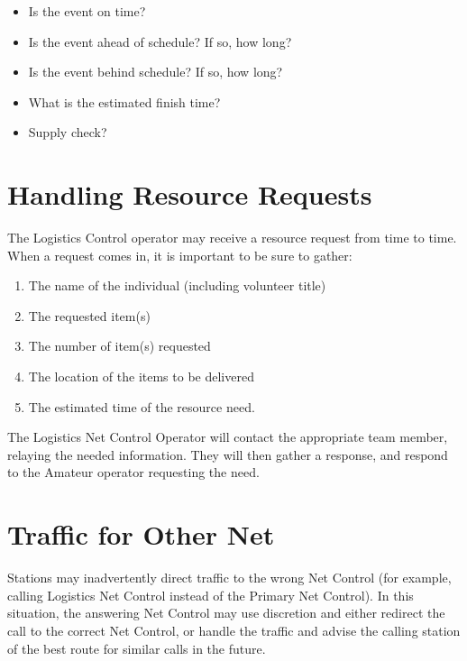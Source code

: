\documentclass[pdflatex,letterpaper,twoside,12pt]{book}
\begin{document}
\begin{itemize}
	\item Is the event on time?
	\item Is the event ahead of schedule? If so, how long?
	\item Is the event behind schedule? If so, how long?
	\item What is the estimated finish time?
	\item Supply check?
\end{itemize}


\section{Handling Resource Requests}

The Logistics Control operator may receive a resource request from time to time. When a request comes in, it is important to be sure to gather:

\begin{enumerate}
	\item The name of the individual (including volunteer title)
	\item The requested item(s)
	\item The number of item(s) requested
	\item The location of the items to be delivered
	\item The estimated time of the resource need.
\end{enumerate}

The Logistics Net Control Operator will contact the appropriate team member, relaying the needed information. They will then gather a response, and respond to the Amateur operator requesting the need.


\section{Traffic for Other Net}

Stations may inadvertently direct traffic to the wrong Net Control (for example, calling Logistics Net Control instead of the Primary Net Control).  In this situation, the answering Net Control may use discretion and either redirect the call to the correct Net Control, or handle the traffic and advise the calling station of the best route for similar calls in the future.
\end{document}
